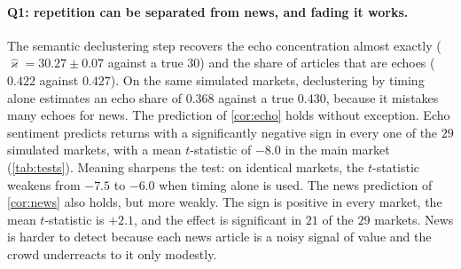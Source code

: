 \documentclass[11pt,a4paper]{article}
\theoremstyle{plain}
\theoremstyle{definition}
\theoremstyle{remark}
\begin{document}
\paragraph{Q1: repetition can be separated from news, and fading it works.} The semantic declustering step recovers the echo concentration almost exactly ($\hat\varkappa=30.27\pm0.07$ against a true $30$) and the share of articles that are echoes ($0.422$ against $0.427$). On the same simulated markets, declustering by timing alone estimates an echo share of $0.368$ against a true $0.430$, because it mistakes many echoes for news. The prediction of \cref{cor:echo} holds without exception. Echo sentiment predicts returns with a significantly negative sign in every one of the $29$ simulated markets, with a mean $t$-statistic of $-8.0$ in the main market (\cref{tab:tests}). Meaning sharpens the test: on identical markets, the $t$-statistic weakens from $-7.5$ to $-6.0$ when timing alone is used. The news prediction of \cref{cor:news} also holds, but more weakly. The sign is positive in every market, the mean $t$-statistic is $+2.1$, and the effect is significant in $21$ of the $29$ markets. News is harder to detect because each news article is a noisy signal of value and the crowd underreacts to it only modestly.
\end{document}

